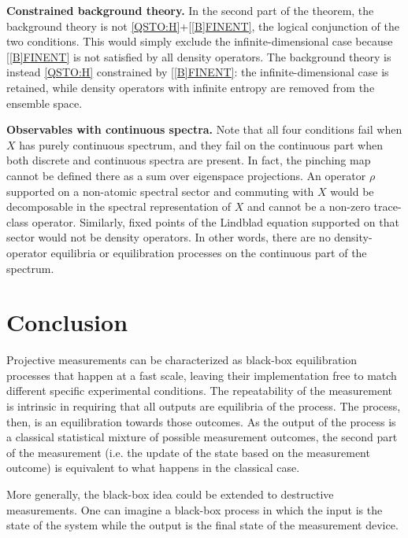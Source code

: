 \documentclass{techbrief}
\begin{document}
\textbf{Constrained background theory.} In the second part of the theorem, the background theory is not \ref{QSTO:H}+\ref{[B]FINENT}, the logical conjunction of the two conditions. This would simply exclude the infinite-dimensional case because \ref{[B]FINENT} is not satisfied by all density operators. The background theory is instead \ref{QSTO:H} constrained by \ref{[B]FINENT}: the infinite-dimensional case is retained, while density operators with infinite entropy are removed from the ensemble space.

\textbf{Observables with continuous spectra.} Note that all four conditions fail when $X$ has purely continuous spectrum, and they fail on the continuous part when both discrete and continuous spectra are present. In fact, the pinching map cannot be defined there as a sum over eigenspace projections. An operator $\rho$ supported on a non-atomic spectral sector and commuting with $X$ would be decomposable in the spectral representation of $X$ and cannot be a non-zero trace-class operator. Similarly, fixed points of the Lindblad equation supported on that sector would not be density operators. In other words, there are no density-operator equilibria or equilibration processes on the continuous part of the spectrum.

\section{Conclusion}

Projective measurements can be characterized as black-box equilibration processes that happen at a fast scale, leaving their implementation free to match different specific experimental conditions. The repeatability of the measurement is intrinsic in requiring that all outputs are equilibria of the process. The process, then, is an equilibration towards those outcomes. As the output of the process is a classical statistical mixture of possible measurement outcomes, the second part of the measurement (i.e. the update of the state based on the measurement outcome) is equivalent to what happens in the classical case.

More generally, the black-box idea could be extended to destructive measurements. One can imagine a black-box process in which the input is the state of the system while the output is the final state of the measurement device.
\end{document}
